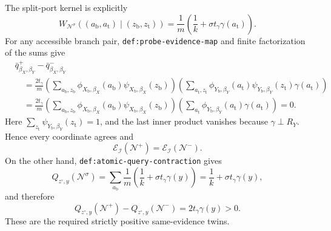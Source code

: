The split-port kernel is explicitly
\[
 W_{\mathcal N^\sigma}((a_{\mathrm b},a_{\mathrm t})\mid
 (z_{\mathrm b},z_{\mathrm t}))
 =\frac1m\left(\frac1k+\sigma t_\gamma\gamma(a_{\mathrm t})\right).
\]
For any accessible branch pair, \texttt{def:probe-evidence-map} and finite factorization of the sums give
\[
\begin{aligned}
 &\bar q^{+}_{\beta_X,\beta_Y}-\bar q^{-}_{\beta_X,\beta_Y}\\
 &\quad=\frac{2t_\gamma}{m}
 \left(\sum_{a_{\mathrm b},z_{\mathrm b}}
 \phi_{X_{\mathrm b},\beta_X}(a_{\mathrm b})
 \psi_{X_{\mathrm b},\beta_X}(z_{\mathrm b})\right)
 \left(\sum_{a_{\mathrm t},z_{\mathrm t}}
 \phi_{Y_{\mathrm b},\beta_Y}(a_{\mathrm t})
 \psi_{Y_{\mathrm b},\beta_Y}(z_{\mathrm t})
 \gamma(a_{\mathrm t})\right)\\
 &\quad=\frac{2t_\gamma}{m}
 \left(\sum_{a_{\mathrm b},z_{\mathrm b}}
 \phi_{X_{\mathrm b},\beta_X}(a_{\mathrm b})
 \psi_{X_{\mathrm b},\beta_X}(z_{\mathrm b})\right)
 \left(\sum_{a_{\mathrm t}}
 \phi_{Y_{\mathrm b},\beta_Y}(a_{\mathrm t})\gamma(a_{\mathrm t})\right)
 =0.
\end{aligned}
\]
Here \(\sum_{z_{\mathrm t}}\psi_{Y_{\mathrm b},\beta_Y}(z_{\mathrm t})=1\), and the last inner product vanishes because \(\gamma\perp R_Y\).  Hence every coordinate agrees and
\[
 \mathcal E_{\mathcal I}(\mathcal N^+)=\mathcal E_{\mathcal I}(\mathcal N^-).
\]
On the other hand, \texttt{def:atomic-query-contraction} gives
\[
 Q_{z^{\circ},y}(\mathcal N^\sigma)
 =\sum_{a_{\mathrm b}}\frac1m
 \left(\frac1k+\sigma t_\gamma\gamma(y)\right)
 =\frac1k+\sigma t_\gamma\gamma(y),
\]
and therefore
\[
 Q_{z^{\circ},y}(\mathcal N^+)-Q_{z^{\circ},y}(\mathcal N^-)
 =2t_\gamma\gamma(y)>0.
\]
These are the required strictly positive same-evidence twins.